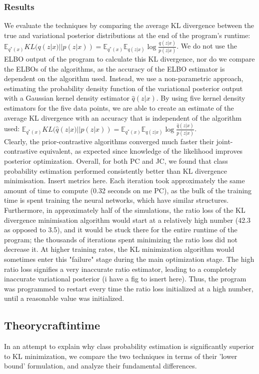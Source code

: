 \documentclass[a4paper,12pt]{article}
\newcommand{\E}{\mathbb{E}}
\numberwithin{equation}{section}
\begin{document}
\subsubsection{Results}
We evaluate the techniques by comparing the average KL divergence between the true and variational posterior distributions at the end of the program's runtime: $\E_{q^*(x)}KL(q(z|x)||p(z|x)) = \E_{q^*(x)}\E_{q(z|x)}\log \frac{q(z|x)}{p(z|x)}$. We do not use the ELBO output of the program to calculate this KL divergence, nor do we compare the ELBOs of the algorithms, as the accuracy of the ELBO estimator is dependent on the algorithm used. Instead, we use a non-parametric approach, estimating the probability density function of the variational posterior output with a Gaussian kernel density estimator $\hat{q}(z|x)$. By using five kernel density estimators for the five data points, we are able to create an estimate of the average KL divergence with an accuracy that is independent of the algorithm used: $\E_{q^*(x)}KL(\hat{q}(z|x)||p(z|x)) = \E_{q^*(x)}\E_{q(z|x)}\log \frac{\hat{q}(z|x)}{p(z|x)}$.\\
Clearly, the prior-contrastive algorithms converged much faster their joint-contrastive equivalent, as expected since knowledge of the likelihood improves posterior optimization. Overall, for both PC and JC, we found that class probability estimation performed consistently better than KL divergence minimisation. Insert metrics here. Each iteration took approximately the same amount of time to compute (0.32 seconds on me PC), as the bulk of the training time is spent training the neural networks, which have similar structures.\\
Furthermore, in approximately half of the simulations, the ratio loss of the KL divergence minimisation algorithm would start at a relatively high number (42.3 as opposed to 3.5), and it would be stuck there for the entire runtime of the program; the thousands of iterations spent minimizing the ratio loss did not decrease it. At higher training rates, the KL minimization algorithm would sometimes enter this "failure" stage during the main optimization stage. The high ratio loss signifies a very inaccurate ratio estimator, leading to a completely inaccurate variational posterior (i have a fig to isnert here). Thus, the program was programmed to restart every time the ratio loss initialized at a high number, until a reasonable value was initialized. 
\newpage
\subsection{Theorycraftintime}
In an attempt to explain why class probability estimation is significantly superior to KL minimization, we compare the two techniques in terms of their 'lower bound' formulation, and analyze their fundamental differences.
\end{document}
